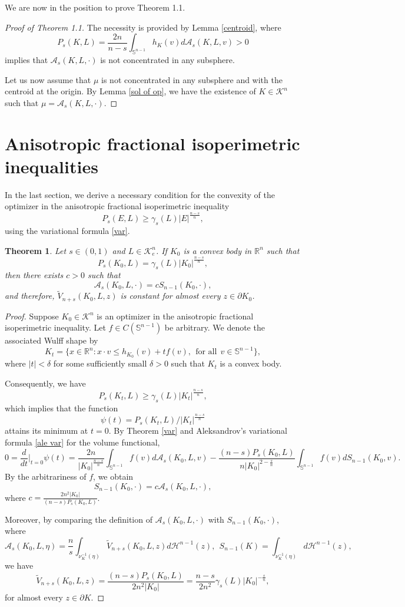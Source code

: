 \documentclass[12pt, oneside,reqno]{amsart}
\numberwithin{equation}{section}
\newtheorem{theorem}{Theorem}[section]
\newtheorem{definition and theorem}[theorem]{Definition and Theorem}
\newcommand{\tA}{\mathcal{A}_s}
\theoremstyle{plain}
\theoremstyle{remark}
\theoremstyle{definition}
\newcommand{\sn}{{\mathbb S}^{n-1}}
\newcommand{\rn}{\mathbb R^n}
\newcommand{\tk}{\mathcal{K}}
\newcommand{\tH}{\mathcal{H}}
\begin{document}
We are now in the position to prove Theorem 1.1.
\begin{proof}[Proof of Theorem 1.1] The necessity is provided by Lemma \ref{centroid}, where
\[P_s(K,L)=\frac{2n}{n-s}\int_{\sn}h_K(v)d\tA(K,L,v)>0\]
implies that $\tA(K,L,\cdot)$ is not concentrated in any subsphere.

Let us now assume that $\mu$ is not concentrated in any subsphere and with the centroid at the origin. By Lemma \ref{sol of op}, we have the existence of $K\in\tk^n$ such that $\mu=\tA(K,L,\cdot)$.
\end{proof}

\section{Anisotropic fractional isoperimetric inequalities }

In the last section, we derive a necessary condition for the convexity of the optimizer in the anisotropic fractional isoperimetric inequality
\[P_s(E,L)\ge \gamma_s(L)|E|^{\frac{n-s}{n}},\]
using the variational formula \eqref{var}.

\begin{theorem}
    Let $s\in(0,1)$ and $L\in\tk_e^n$. If $K_0$ is a convex body in $\rn$ such that
\[P_s(K_0,L)=\gamma_s(L)|K_0|^{\frac{n-s}{n}},\]
then there exists $c>0$ such that
\[\tA(K_0,L,\cdot)=cS_{n-1}(K_0,\cdot),\]
and therefore, $\tilde{V}_{n+s}(K_0,L,z)$ is constant for almost every $z\in\partial K_0$.
\end{theorem}

\begin{proof}
    Suppose $K_0\in\tk^n$ is an optimizer in the anisotropic fractional isoperimetric inequality. Let $f\in C(\sn)$ be arbitrary. We denote the associated Wulff shape by
    \[K_t=\{x\in\rn:  x\cdot v \leq h_{K_0}(v)+tf(v),~~\text{for all}~~v\in\sn\},\]
    where $|t|<\delta$ for some sufficiently small $\delta>0$ such that $K_t$ is a convex body. 
    
    Consequently, we have
    \[P_s(K_t,L)\ge \gamma_s(L)|K_t|^{\frac{n-s}{n}},\]
    which implies that the function
    \[\psi(t)=P_s(K_t,L)/|K_t|^{\frac{n-s}{n}}\]
    attains its minimum at $t=0$. By Theorem \ref{var} and Aleksandrov’s variational formula \eqref{ale var} for the volume functional,
    \[0=\frac{d}{dt}\Big|_{t=0}\psi(t)=\frac{2n}{|K_0|^{\frac{n-s}{n}}}\int_{\sn}f(v)d\tA(K_0,L,v)-\frac{(n-s)P_s(K_0,L)}{n|K_0|^{2-\frac{s}{n}}}\int_{\sn}f(v)dS_{n-1}(K_0,v).\]
    By the arbitrariness of $f$, we obtain
    \[S_{n-1}(K_0,\cdot)=c\tA(K_0,L,\cdot),\]
    where $c=\frac{2n^2|K_0|}{(n-s)P_s(K_0,L)}$.

    Moreover, by comparing the definition of $\tA(K_0,L,\cdot)$ with $S_{n-1}(K_0,\cdot)$, where
    \[\tA(K_0,L,\eta)=\frac{n}{s}\int_{\nu_K^{-1}(\eta)}\tilde{V}_{n+s}(K_0,L,z)d\tH^{n-1}(z),~~S_{n-1}(K)=\int_{\nu_K^{-1}(\eta)}d\tH^{n-1}(z),\]
    we have
    \[\tilde{V}_{n+s}(K_0,L,z)=\frac{(n-s)P_s(K_0,L)}{2n^2|K_0|}=\frac{n-s}{2n^2}\gamma_s(L)|K_0|^{-\frac{s}{n}},\]
    for almost every $z\in\partial K$.
\end{proof}
\end{document}
